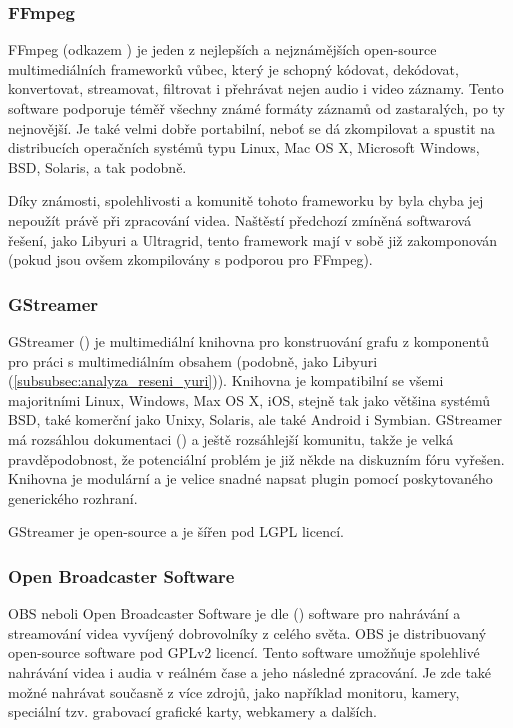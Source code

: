 \documentclass[thesis=M,czech]{FITthesis}[2012/06/26]
\begin{document}
\subsubsection{FFmpeg} \label{subsubsec:analyza_reseni_ffmpeg}
FFmpeg (odkazem \cite{ffmpeg}) je jeden z nejlepších a nejznámějších open-source multimediálních frameworků vůbec, který je schopný kódovat, dekódovat, konvertovat, streamovat, filtrovat i přehrávat nejen audio i video záznamy. Tento software podporuje téměř všechny známé formáty záznamů od zastaralých, po ty nejnovější. Je také velmi dobře portabilní, neboť se dá zkompilovat a spustit na distribucích operačních systémů typu Linux, Mac OS X, Microsoft Windows, BSD, Solaris, a tak podobně.

	Díky známosti, spolehlivosti a komunitě tohoto frameworku by byla chyba jej nepoužít právě při zpracování videa. Naštěstí předchozí zmíněná softwarová řešení, jako Libyuri a Ultragrid, tento framework mají v sobě již zakomponován (pokud jsou ovšem zkompilovány s podporou pro FFmpeg).

\subsubsection{GStreamer} \label{subsubsec:analyza_reseni_gstreamer}
GStreamer (\cite{gstreamer}) je multimediální knihovna pro konstruování grafu z komponentů pro práci s multimediálním obsahem (podobně, jako Libyuri (\ref{subsubsec:analyza_reseni_yuri})). Knihovna je kompatibilní se všemi majoritními Linux, Windows, Max OS X, iOS, stejně tak jako většina systémů BSD, také komerční jako Unixy, Solaris, ale také Android i Symbian. GStreamer má rozsáhlou dokumentaci (\cite{gstreamer_doc}) a ještě rozsáhlejší komunitu, takže je velká pravděpodobnost, že potenciální problém je již někde na diskuzním fóru vyřešen. Knihovna je modulární a je velice snadné napsat plugin pomocí poskytovaného generického rozhraní.

	GStreamer je open-source a je šířen pod LGPL licencí.

\subsubsection{Open Broadcaster Software} \label{subsubsec:analyza_reseni_obs}
OBS neboli Open Broadcaster Software je dle (\cite{obs}) software pro nahrávání a streamování videa vyvíjený dobrovolníky z celého světa. OBS je distribuovaný open-source software pod GPLv2 licencí. Tento software umožňuje spolehlivé nahrávání videa i audia v reálném čase a jeho následné zpracování. Je zde také možné nahrávat současně z více zdrojů, jako například monitoru, kamery, speciální tzv. grabovací grafické karty, webkamery a dalších.
\end{document}
